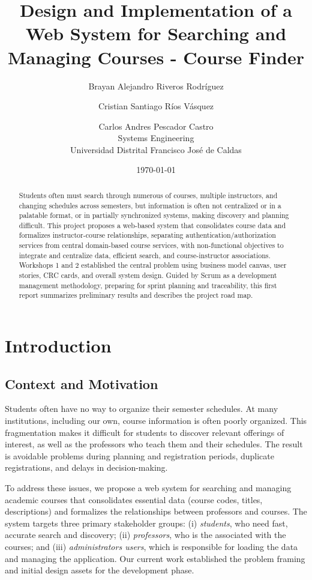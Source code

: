 \documentclass[12pt,a4paper]{article}
\title{\textbf{Design and Implementation of a Web System for Searching and Managing Courses - Course Finder}}
\author{%
  Brayan Alejandro Riveros Rodríguez \and
  Cristian Santiago Ríos Vásquez \and
  Carlos Andres Pescador Castro\\[0.25em]
  \normalsize Systems Engineering\\
  \normalsize Universidad Distrital Francisco José de Caldas
}
\date{\today}
\begin{document}
	
\maketitle

\begin{abstract}
Students often must search through numerous of courses, multiple instructors, and changing schedules across semesters, but information is often not centralized or in a palatable format, or in partially synchronized systems, making discovery and planning difficult. This project proposes a web-based system that consolidates course data and formalizes instructor-course relationships, separating authentication/authorization services from central domain-based course services, with non-functional objectives to integrate and centralize data, efficient search, and course-instructor associations. Workshops 1 and 2 established the central problem using business model canvas, user stories, CRC cards, and overall system design. Guided by Scrum as a development management methodology, preparing for sprint planning and traceability, this first report summarizes preliminary results and describes the project road map.
\end{abstract}

\tableofcontents
\listoffigures
\listoftables
\newpage

\section{Introduction}
\label{sec:intro}

\subsection{Context and Motivation}
Students often have no way to organize their semester schedules. At many institutions, including our own, course information is often poorly organized. This fragmentation makes it difficult for students to discover relevant offerings of interest, as well as the professors who teach them and their schedules. The result is avoidable problems during planning and registration periods, duplicate registrations, and delays in decision-making.\newline

To address these issues, we propose a web system for searching and managing academic courses that consolidates essential data (course codes, titles, descriptions) and formalizes the relationships between professors and courses. The system targets three primary stakeholder groups: (i) \textit{students}, who need fast, accurate search and discovery; (ii) \textit{professors}, who is the associated with the courses; and (iii) \textit{administrators users}, which is responsible for loading the data and managing the application. Our current work established the problem framing and initial design assets for the development phase.\newline
\end{document}
